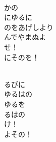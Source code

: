 \documentclass[10pt,b5j]{tarticle} %
\begin{document}
\vspace{1.5em} %
\newcommand{\linespace}{0.5em} %
\newcommand{\blocksize}{0.5\hsize} %
\newcommand{\itemmargin}{3em} %
\begin{enumerate} %
    \setlength{\itemindent}{\itemmargin} %
    \begin{minipage}[c]{\blocksize}
    
        \vspace{\linespace}
        \item~\\
        かの\\
        にゆるに\\
        のをあげしより\\
        んでやまぬよ\\
        せ！\\
        にそのを！
        
    \end{minipage}
    \begin{minipage}[c]{\blocksize}
        
        \vspace{\linespace}
        \item~\\
        るびに\\
        ゆるはの\\
        ゆるを\\
        るはの\\
        け！\\
        よその！
        
    \end{minipage}
    \begin{minipage}[c]{\blocksize}
        

\end{minipage}
\end{enumerate}
\end{document}
